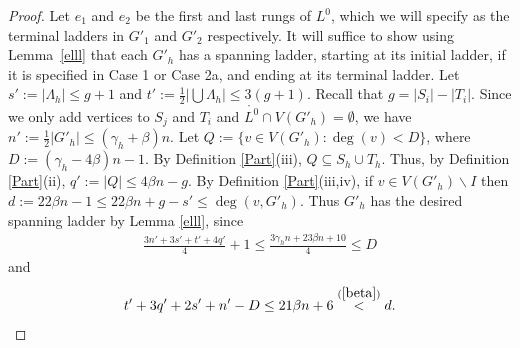 \documentclass[oneside,12pt]{memoir}
\newtheorem{definition}[theorem]{Definition}
\newcommand{\ep}{\epsilon}
\newcommand{\g}{\gamma}
\newcommand{\half}{\frac{1}{2}}
\begin{document}
\begin{proof}
Let $e_1$ and $e_2$ be the first and last rungs of $L^{0}$, which we will specify as the terminal ladders in $G'_1$ and $G'_2$ respectively. It will suffice to show using Lemma~\ref{elll} that each $G'_{h}$ has a spanning ladder, starting at its initial ladder, if it is specified in Case 1 or Case 2a, and ending at its terminal ladder. Let $s':=|\Lambda_{h}|\le g+1$ and $t':=\half|\bigcup \Lambda_{h}|\le 3(g+1)$.  Recall that $g=|S_i|-|T_i|$. Since we only add vertices to $S_{j}$ and $T_{i}$ and $\mathring{L^0}\cap V(G'_h)=\emptyset$, we have $n':=\frac{1}{2}|G'_{h}|\le(\gamma_{h}+\beta)n$. Let $Q:=\{v\in V(G'_{h}):\deg(v)<D\}$, where $D:=(\g_{h}-4\beta)n-1$. By Definition \ref{Part}(iii), $Q\subseteq S_{h}\cup T_{h}$. Thus, by Definition \ref{Part}(ii), $q':=|Q|\le4\beta n-g$. By Definition \ref{Part}(iii,iv), if $v\in V(G'_{h})\smallsetminus I$ then $ d:=22\beta n-1\le 22\beta n+g-s'\le \deg(v,G'_{h})$. Thus $G'_{h}$ has the desired spanning ladder by Lemma \ref{elll}, since
\begin{align*}
\frac{3n'+3s' +t' +4q'}{4}+1 \le \frac{3\g_{h}n+23\beta n+10}{4}\le D
\end{align*}
and 
\begin{align*}
t'+3q'+2s'+n'-D\le 21\beta n+6\stackrel{(\ref{beta})}{<} d.
\end{align*}

\end{proof}
% 
% 
\end{document}
